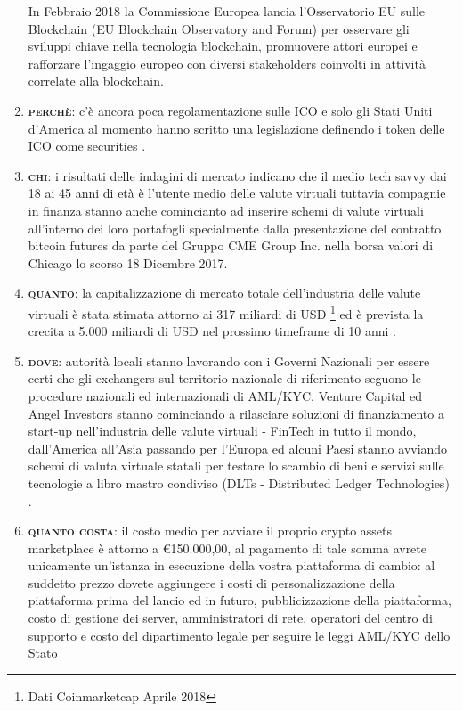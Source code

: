 \begin{enumerate}
	In Febbraio 2018 la Commissione Europea lancia l'Osservatorio EU sulle Blockchain (EU Blockchain Observatory and Forum) \cite{EUBOaF} 
	per osservare gli sviluppi chiave nella tecnologia blockchain, promuovere attori europei e rafforzare l'ingaggio europeo con
	diversi stakeholders coinvolti in attività correlate alla blockchain.
	\item \textbf{\textsc{perchè}}: c'è ancora poca regolamentazione sulle ICO e solo gli Stati Uniti d'America al momento
	hanno scritto una legislazione definendo i token delle ICO come securities \cite{SECICO}.
	\item \textbf{\textsc{chi}}: i risultati delle indagini di mercato indicano che il medio tech savvy dai 18 ai 45 anni di età è
	l'utente medio delle valute virtuali tuttavia compagnie in finanza stanno anche comincianto ad inserire schemi di 
	valute virtuali all'interno dei loro portafogli specialmente dalla presentazione del contratto bitcoin futures 
	da parte del Gruppo CME Group Inc. nella borsa valori di Chicago lo scorso 18 Dicembre 2017.
	\item \textbf{\textsc{quanto}}: la capitalizzazione di mercato totale dell'industria delle valute virtuali è stata stimata attorno
	ai 317 miliardi di USD \footnote{Dati Coinmarketcap Aprile 2018}
	ed è prevista la crecita a 5.000 miliardi di USD nel prossimo timeframe di 10 anni \cite{cryptoMCTenYears}.
	\item \textbf{\textsc{dove}}: autorità locali stanno lavorando con i Governi Nazionali per essere certi che gli exchangers sul 
	territorio nazionale di riferimento seguono le procedure nazionali ed internazionali di AML/KYC.
	Venture Capital ed Angel Investors stanno cominciando a rilasciare soluzioni di finanziamento a start-up nell'industria delle
	valute virtuali - FinTech in tutto il mondo, dall'America all'Asia passando per l'Europa ed alcuni Paesi
	stanno avviando schemi di valuta virtuale statali per testare lo scambio di beni e servizi sulle tecnologie a libro 
	mastro condiviso (DLTs - Distributed Ledger Technologies) \cite{petro}.
	\item \textbf{\textsc{quanto costa}}: il costo medio per avviare il proprio crypto assets marketplace è attorno a \euro 150.000,00, 
	al pagamento di tale somma avrete unicamente un'istanza in esecuzione della vostra piattaforma di cambio: al suddetto prezzo dovete aggiungere i costi
	di personalizzazione della piattaforma prima del lancio ed in futuro, pubblicizzazione della piattaforma, costo di gestione dei server, 
	amministratori di rete, operatori del centro di supporto e costo del dipartimento legale per seguire le leggi AML/KYC dello Stato

\end{enumerate}
